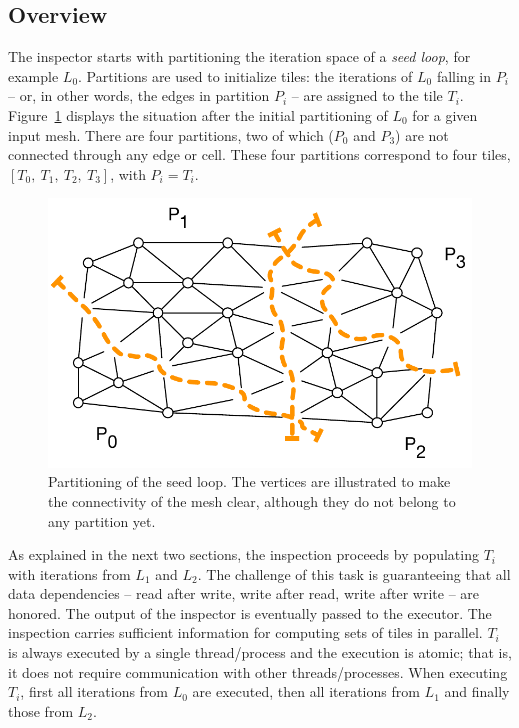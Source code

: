 \subsection*{Overview}
The inspector starts with partitioning the iteration space of a \textit{seed loop}, for example $L_0$. Partitions are used to initialize tiles: the iterations of $L_0$ falling in $P_i$ -- or, in other words, the edges in partition $P_i$ -- are assigned to the tile $T_i$. Figure~\ref{fig:st-initial-part-sm} displays the situation after the initial partitioning of $L_0$ for a given input mesh. There are four partitions, two of which ($P_0$ and $P_3$) are not connected through any edge or cell. These four partitions correspond to four tiles, $[T_0,\ T_1,\ T_2,\ T_3]$, with $P_i = T_i$.

\begin{figure}
\centering
\includegraphics[scale=0.6]{sparsetiling/figures/partiotioned.pdf}
\caption{Partitioning of the seed loop. The vertices are illustrated to make the connectivity of the mesh clear, although they do not belong to any partition yet.}
\label{fig:st-initial-part-sm}
\end{figure}

As explained in the next two sections, the inspection proceeds by populating $T_i$ with iterations from $L_1$ and $L_2$. The challenge of this task is guaranteeing that all data dependencies -- read after write, write after read, write after write -- are honored. The output of the inspector is eventually passed to the executor. The inspection carries sufficient information for computing sets of tiles in parallel. $T_i$ is always executed by a single thread/process and the execution is atomic; that is, it does not require communication with other threads/processes. When executing $T_i$, first all iterations from $L_0$ are executed, then all iterations from $L_1$ and finally those from $L_2$.

